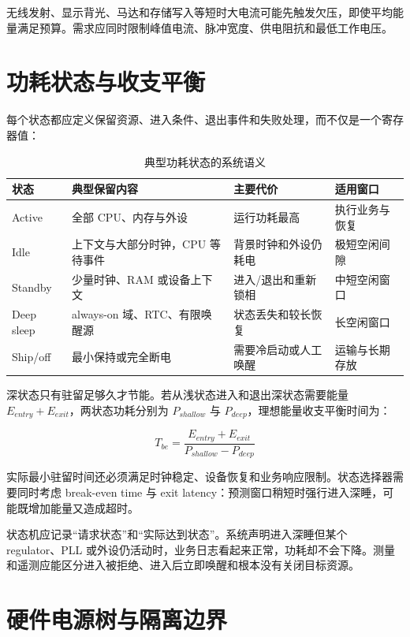 无线发射、显示背光、马达和存储写入等短时大电流可能先触发欠压，即使平均能量满足预算。需求应同时限制峰值电流、脉冲宽度、供电阻抗和最低工作电压。

\section{功耗状态与收支平衡}

每个状态都应定义保留资源、进入条件、退出事件和失败处理，而不仅是一个寄存器值：

\begin{table}[H]
  \centering
  \caption{典型功耗状态的系统语义}
  \begin{tabular}{p{25mm}p{43mm}p{34mm}p{27mm}}
    \hline
    状态 & 典型保留内容 & 主要代价 & 适用窗口 \\
    \hline
    Active & 全部 CPU、内存与外设 & 运行功耗最高 & 执行业务与恢复 \\
    Idle & 上下文与大部分时钟，CPU 等待事件 & 背景时钟和外设仍耗电 & 极短空闲间隙 \\
    Standby & 少量时钟、RAM 或设备上下文 & 进入/退出和重新锁相 & 中短空闲窗口 \\
    Deep sleep & always-on 域、RTC、有限唤醒源 & 状态丢失和较长恢复 & 长空闲窗口 \\
    Ship/off & 最小保持或完全断电 & 需要冷启动或人工唤醒 & 运输与长期存放 \\
    \hline
  \end{tabular}
\end{table}

深状态只有驻留足够久才节能。若从浅状态进入和退出深状态需要能量 $E_{entry}+E_{exit}$，两状态功耗分别为 $P_{shallow}$ 与 $P_{deep}$，理想能量收支平衡时间为：

\begin{equation}
  T_{be}=\frac{E_{entry}+E_{exit}}{P_{shallow}-P_{deep}}
\end{equation}

实际最小驻留时间还必须满足时钟稳定、设备恢复和业务响应限制。状态选择器需要同时考虑 break-even time 与 exit latency：预测窗口稍短时强行进入深睡，可能既增加能量又造成超时。

状态机应记录“请求状态”和“实际达到状态”。系统声明进入深睡但某个 regulator、PLL 或外设仍活动时，业务日志看起来正常，功耗却不会下降。测量和遥测应能区分进入被拒绝、进入后立即唤醒和根本没有关闭目标资源。

\section{硬件电源树与隔离边界}


